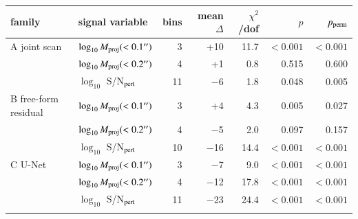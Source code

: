 \begin{tabular}{@{}llrrrrr@{}}
\toprule
family & signal variable & bins & mean $\Delta$ & $\chi^2$/dof & $p$ & $p_{\rm perm}$ \\
\midrule
A joint scan & $\log_{10} M_{\rm proj}(<0.1'')$ & 3 & +10 & 11.7 & $<0.001$ & $<0.001$ \\
 & $\log_{10} M_{\rm proj}(<0.2'')$ & 4 & +1 & 0.8 & 0.515 & 0.600 \\
 & $\log_{10}$ S/N$_{\rm pert}$ & 11 & $-$6 & 1.8 & 0.048 & 0.005 \\
\addlinespace[2pt]
B free-form residual & $\log_{10} M_{\rm proj}(<0.1'')$ & 3 & +4 & 4.3 & 0.005 & 0.027 \\
 & $\log_{10} M_{\rm proj}(<0.2'')$ & 4 & $-$5 & 2.0 & 0.097 & 0.157 \\
 & $\log_{10}$ S/N$_{\rm pert}$ & 10 & $-$16 & 14.4 & $<0.001$ & $<0.001$ \\
\addlinespace[2pt]
C U-Net & $\log_{10} M_{\rm proj}(<0.1'')$ & 3 & $-$7 & 9.0 & $<0.001$ & $<0.001$ \\
 & $\log_{10} M_{\rm proj}(<0.2'')$ & 4 & $-$12 & 17.8 & $<0.001$ & $<0.001$ \\
 & $\log_{10}$ S/N$_{\rm pert}$ & 11 & $-$23 & 24.4 & $<0.001$ & $<0.001$ \\
\addlinespace[2pt]
\bottomrule
\end{tabular}
